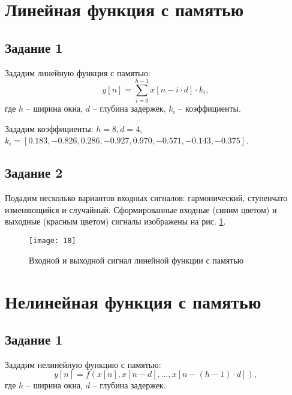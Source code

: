 \newpage

\section{Линейная функция с памятью}

\subsection{Задание 1}

Зададим линейную функция с памятью:
\begin{equation*}
y[n] = \sum_{i=0}^{h-1} x[n - i\cdot d]\cdot k_i,
\end{equation*}
где $h$ – ширина окна, $d$ – глубина задержек, $k_i$ – коэффициенты.

Зададим коэффициенты: $h = 8, d = 4$,\\
$k_i = [0.183, -0.826, 0.286, -0.927, 0.970, -0.571, -0.143, -0.375]$.

\subsection{Задание 2}

Подадим несколько вариантов входных сигналов: гармонический, ступенчато изменяющийся и случайный. Сформированные входные (синим цветом) и выходные (красным цветом) сигналы изображены на рис. \ref{fig:linear_function}.

\begin{figure}[H]
\begin{center}
	\texttt{[image: 18]}
	\caption{Входной и выходной сигнал линейной функции с памятью}
	\label{fig:linear_function}
\end{center}
\end{figure}

\section{Нелинейная функция с памятью}

\subsection{Задание 1}

Зададим нелинейную функцию с памятью:
\begin{equation*}
y[n] = f(x[n], x[n - d],..., x[n - (h - 1)\cdot d]),
\end{equation*}
где $h$ – ширина окна, $d$ – глубина задержек.

